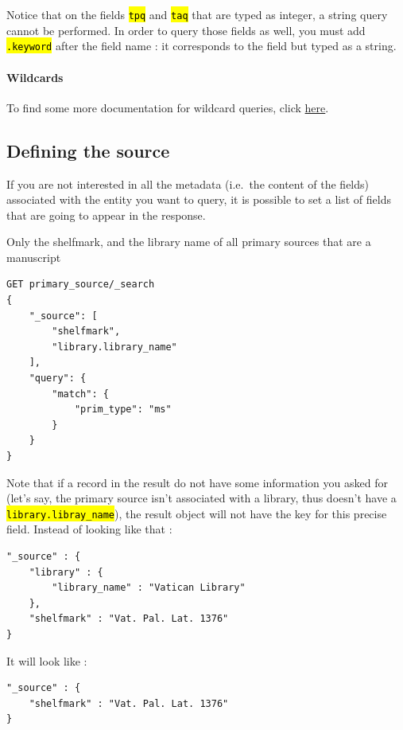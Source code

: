 \documentclass[a4paper,12pt,twoside]{book}
\let\OldTexttt\texttt
\renewcommand{\texttt}[1]{\OldTexttt{\hl{#1}}}
\let\quoteOld\quote
\let\endquoteOld\endquote
\renewenvironment{quote}{\small\quoteOld}{\endquoteOld}
\begin{document}
Notice that on the fields \texttt{tpq} and \texttt{taq} that are typed as integer, a string query cannot be performed. In order to query those fields as well, you must add \texttt{.keyword} after the field name : it corresponds to the field but typed as a string.

				\paragraph{Wildcards}\label{wildcards}

To find some more documentation for wildcard queries, click \href{https://www.elastic.co/guide/en/elasticsearch/reference/current/query-dsl-wildcard-query.html}{here}.

		\subsection{Defining the source}\label{defining-the-source}

If you are not interested in all the metadata (i.e.~the content of the fields) associated with the entity you want to query, it is possible to set a list of fields that are going to appear in the response.

\begin{quote}
	Only the shelfmark, and the library name of all primary sources that are a manuscript
\end{quote}

\begin{lstlisting}
GET primary_source/_search
{
    "_source": [
        "shelfmark",
        "library.library_name"
    ],
    "query": {
        "match": {
            "prim_type": "ms"
        }
    }
}
\end{lstlisting}

Note that if a record in the result do not have some information you asked for (let's say, the primary source isn't associated with a library, thus doesn't have a \texttt{library.libray\_name}), the result object will not have the key for this precise field. Instead of looking like that :

\begin{lstlisting}
"_source" : {
    "library" : {
        "library_name" : "Vatican Library"
    },
    "shelfmark" : "Vat. Pal. Lat. 1376"
}
\end{lstlisting}

It will look like :

\begin{lstlisting}
"_source" : {
    "shelfmark" : "Vat. Pal. Lat. 1376"
}
\end{lstlisting}
\end{document}
